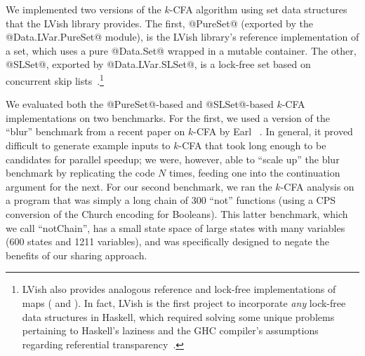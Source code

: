 We implemented two versions of the $k$-CFA algorithm using set data
structures that the LVish library provides.  The first, @PureSet@
(exported by the @Data.LVar.PureSet@ module), is the LVish library's
reference implementation of a set, which uses a pure @Data.Set@
wrapped in a mutable container.  The other, @SLSet@, exported by
@Data.LVar.SLSet@, is a lock-free set based on concurrent skip
lists~\cite{art}.\footnote{LVish also provides analogous reference and
  lock-free implementations of maps ( and ).  In
  fact, LVish is the first project to incorporate \emph{any} lock-free
  data structures in Haskell, which required solving some unique
  problems pertaining to Haskell's laziness and the GHC compiler's
  assumptions regarding referential
  transparency~\cite{RyanAtomicPrimopsTalk}.}

We evaluated both the @PureSet@-based and @SLSet@-based $k$-CFA
implementations on two benchmarks. For the first, we used a version of
the ``blur'' benchmark from a recent paper on $k$-CFA by Earl
\etal~.  In general, it proved
difficult to generate example inputs to $k$-CFA that took long enough
to be candidates for parallel speedup; we were, however, able to
``scale up'' the blur benchmark by replicating the code $N$ times,
feeding one into the continuation argument for the next.  For our
second benchmark, we ran the $k$-CFA analysis on a program that was
simply a long chain of $300$ ``not'' functions (using a CPS conversion
of the Church encoding for Booleans).  This latter benchmark, which we
call ``notChain'', has a small state space of large states with many
variables (600 states and 1211 variables), and was specifically
designed to negate the benefits of our sharing approach.

